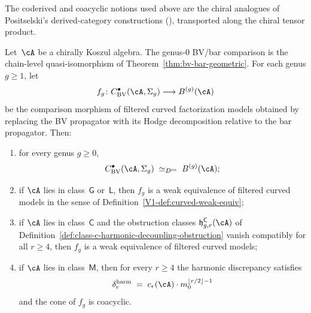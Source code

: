 \begin{remark}
The coderived and coacyclic notions used above are the chiral
analogues of Positselski's derived-category constructions
(\cite{Positselski11}), transported along the chiral tensor
product.
\end{remark}

\begin{theorem}[BV$=$bar in the coderived category;
\ClaimStatusProvedHere]%
\label{thm:bv-bar-coderived}%
%
%
Let~$\cA$ be a chirally Koszul algebra. The genus-$0$ BV/bar
comparison is the chain-level quasi-isomorphism of
Theorem~\ref{thm:bv-bar-geometric}. For each genus
$g \geq 1$, let
\[
 f_g \colon
 C^{\bullet}_{\mathrm{BV}}(\cA, \Sigma_g)
 \longrightarrow
 B^{(g)}(\cA)
\]
be the comparison morphism of filtered curved
factorization models
obtained by replacing the BV propagator with its Hodge
decomposition relative to the bar propagator. Then:
\begin{enumerate}[label=\textup{(\roman*)}]
\item for every genus $g \geq 0$,
\[
 C^{\bullet}_{\mathrm{BV}}(\cA, \Sigma_g)
 \;\simeq_{D^{\mathrm{co}}}\;
 B^{(g)}(\cA);
\]
\item if $\cA$ lies in class~$\mathsf{G}$ or~$\mathsf{L}$, then
 $f_g$ is a weak equivalence of filtered curved models in the sense
 of Definition~\ref{V1-def:curved-weak-equiv};
\item if $\cA$ lies in class~$\mathsf{C}$ and the obstruction classes
 \(\mathfrak h_{g,r}^{\mathsf C}(\cA)\) of
 Definition~\ref{def:class-c-harmonic-decoupling-obstruction} vanish
 compatibly for all \(r\ge4\), then $f_g$ is a weak equivalence of
 filtered curved models;
\item if $\cA$ lies in class~$\mathsf{M}$, then for every $r \geq 4$
 the harmonic discrepancy satisfies
\[
 \delta_r^{\mathrm{harm}}
 \;=\;
 c_r(\cA) \cdot m_0^{\lfloor r/2 \rfloor - 1}
\]
and the cone of $f_g$ is coacyclic.
\end{enumerate}
\end{theorem}

